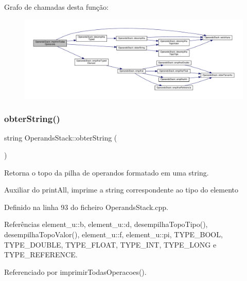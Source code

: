 Grafo de chamadas desta função\+:
\nopagebreak
\begin{figure}[H]
\begin{center}
\leavevmode
\includegraphics[width=350pt]{classOperandsStack_a21ecd56a74034dbd8ed6925924cf30e6_cgraph}
\end{center}
\end{figure}
\mbox{\label{classOperandsStack_a32ad6a1ea26c02cf709fed1e86412b4a}} 
\subsubsection{\texorpdfstring{obter\+String()}{obterString()}}
{\footnotesize\ttfamily string Operands\+Stack\+::obter\+String (\begin{DoxyParamCaption}{ }\end{DoxyParamCaption})}



Retorna o topo da pilha de operandos formatado em uma string. 

Auxiliar do print\+All, imprime a string correspondente ao tipo do elemento 

Definido na linha 93 do ficheiro Operands\+Stack.\+cpp.



Referências element\+\_\+u\+::b, element\+\_\+u\+::d, desempilha\+Topo\+Tipo(), desempilha\+Topo\+Valor(), element\+\_\+u\+::f, element\+\_\+u\+::pi, T\+Y\+P\+E\+\_\+\+B\+O\+OL, T\+Y\+P\+E\+\_\+\+D\+O\+U\+B\+LE, T\+Y\+P\+E\+\_\+\+F\+L\+O\+AT, T\+Y\+P\+E\+\_\+\+I\+NT, T\+Y\+P\+E\+\_\+\+L\+O\+NG e T\+Y\+P\+E\+\_\+\+R\+E\+F\+E\+R\+E\+N\+CE.



Referenciado por imprimir\+Todas\+Operacoes().

